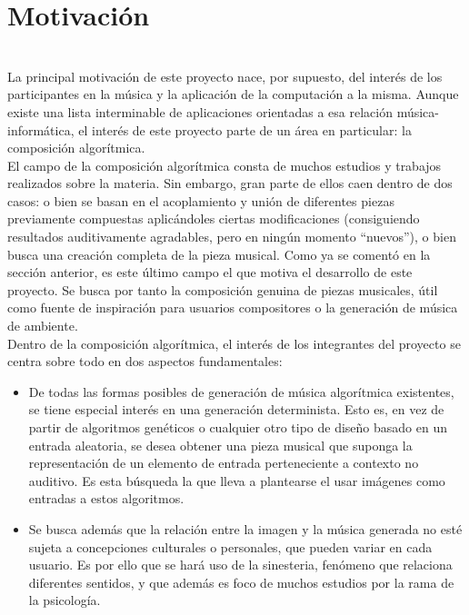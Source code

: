 \section{Motivación}
\label{sec:motivacion}

\\

La principal motivación de este proyecto nace, por supuesto, del interés de los participantes en la música \color{blue}y la aplicación de la computación a la misma\color{black}. Aunque existe una lista interminable de aplicaciones orientadas a esa relación música-informática, el interés de este proyecto parte de un área en particular: la composición algorítmica.\\

El campo de la composición algorítmica consta de muchos estudios y trabajos realizados sobre la materia. Sin embargo, gran parte de ellos caen dentro de dos casos: o bien se basan en el acoplamiento y unión de diferentes piezas previamente compuestas aplicándoles ciertas modificaciones (consiguiendo resultados auditivamente agradables, pero en ningún momento ``nuevos''), o bien busca una creación completa de la pieza musical. Como ya se comentó en la sección anterior, es este último campo el que motiva el desarrollo de este proyecto. Se busca por tanto la composición genuina de piezas musicales, útil como fuente de inspiración para usuarios compositores o la generación de música de ambiente.\\

Dentro de la composición algorítmica, el interés de los integrantes del proyecto se centra sobre todo en dos aspectos fundamentales:

\begin{itemize}

	\item De todas las formas posibles de generación de música algorítmica existentes, se tiene especial interés en una generación determinista. Esto es, en vez de partir de algoritmos genéticos o cualquier otro tipo de diseño basado en un entrada aleatoria, se desea obtener una pieza musical que suponga \color{blue}la representación de un elemento de entrada perteneciente a contexto no auditivo\color{black}. Es esta búsqueda la que lleva a plantearse el usar imágenes como entradas a estos algoritmos.
	
	\item  \color{blue}Se busca además que la relación entre la imagen y la música generada no esté sujeta a concepciones culturales o personales, que pueden variar en cada usuario. Es por ello que se hará uso de la sinesteria, fenómeno que relaciona diferentes sentidos, y que además es foco de muchos estudios por la rama de la psicología.\color{black}
	
\end{itemize}

